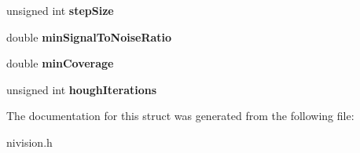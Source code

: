\begin{DoxyCompactItemize}
\item 
\hypertarget{structStraightEdgeOptions__struct_ab3138dc499e03eb59b1aa3ea8a6c7c18}{unsigned int {\bfseries step\-Size}}\label{structStraightEdgeOptions__struct_ab3138dc499e03eb59b1aa3ea8a6c7c18}

\item 
\hypertarget{structStraightEdgeOptions__struct_ab8657f6ca8712dd67d05564231ee1d27}{double {\bfseries min\-Signal\-To\-Noise\-Ratio}}\label{structStraightEdgeOptions__struct_ab8657f6ca8712dd67d05564231ee1d27}

\item 
\hypertarget{structStraightEdgeOptions__struct_a26484accfcff2b81160c155dc4881115}{double {\bfseries min\-Coverage}}\label{structStraightEdgeOptions__struct_a26484accfcff2b81160c155dc4881115}

\item 
\hypertarget{structStraightEdgeOptions__struct_a29293bcd761ffd6cf22a63d1cb6fde05}{unsigned int {\bfseries hough\-Iterations}}\label{structStraightEdgeOptions__struct_a29293bcd761ffd6cf22a63d1cb6fde05}

\end{DoxyCompactItemize}


\-The documentation for this struct was generated from the following file\-:\begin{DoxyCompactItemize}
\item 
nivision.\-h\end{DoxyCompactItemize}
